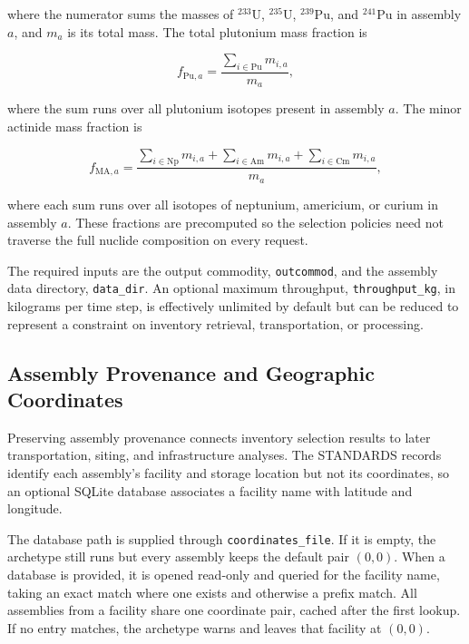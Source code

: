 where the numerator sums the masses of \({}^{233}\mathrm{U}\),
\({}^{235}\mathrm{U}\), \({}^{239}\mathrm{Pu}\), and \({}^{241}\mathrm{Pu}\) in
assembly \(a\), and \(m_a\) is its total mass. The total plutonium mass fraction
is

\begin{equation}
    f_{\mathrm{Pu},a}
    =
    \frac{\displaystyle\sum_{i \in \mathrm{Pu}}m_{i,a}}{m_a},
    \label{eq:usinv-pu-fraction}
\end{equation}

where the sum runs over all plutonium isotopes present in assembly \(a\). The
minor actinide mass fraction is

\begin{equation}
    f_{\mathrm{MA},a}
    =
    \frac{
        \displaystyle
        \sum_{i \in \mathrm{Np}}m_{i,a}
        + \sum_{i \in \mathrm{Am}}m_{i,a}
        + \sum_{i \in \mathrm{Cm}}m_{i,a}
    }{m_a},
    \label{eq:usinv-ma-fraction}
\end{equation}

where each sum runs over all isotopes of neptunium, americium, or curium in
assembly \(a\). These fractions are precomputed so the selection policies need not
traverse the full nuclide composition on every request.

The required inputs are the output commodity, \texttt{outcommod}, and the
assembly data directory, \texttt{data\_dir}. An optional maximum throughput,
\texttt{throughput\_kg}, in kilograms per time step, is effectively unlimited by
default but can be reduced to represent a constraint on inventory retrieval,
transportation, or processing.

\subsection{Assembly Provenance and Geographic Coordinates}
\label{subsec:us-inventory-provenance}

Preserving assembly provenance connects inventory selection results to later
transportation, siting, and infrastructure analyses. The \gls{STANDARDS} records
identify each assembly's facility and storage location but not its coordinates,
so an optional SQLite database associates a facility name with latitude and
longitude.

The database path is supplied through \texttt{coordinates\_file}. If it is empty,
the archetype still runs but every assembly keeps the default pair \((0,0)\). When a
database is provided, it is opened read-only and queried for the facility name,
taking an exact match where one exists and otherwise a prefix match. All
assemblies from a facility share one coordinate pair, cached after the first
lookup. If no entry matches, the archetype warns and leaves that facility at
\((0,0)\).

